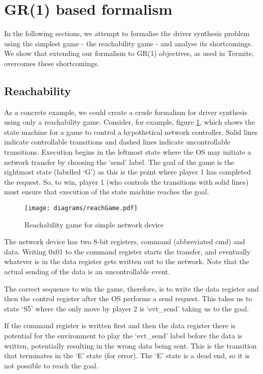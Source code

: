 \section{GR(1) based formalism}

In the following sections, we attempt to formalise the driver synthesis problem using the simplest game - the reachability game - and analyse its shortcomings. We show that extending our formalism to GR(1) objectives, as used in Termite, overcomes these shortcomings.

\subsection{Reachability}

As a concrete example, we could create a crude formalism for driver synthesis using only a reachability game. Consider, for example, figure \ref{fig:reach}, which shows the state machine for a game to control a hypothetical network controller. Solid lines indicate controllable transitions and dashed lines indicate uncontrollable transitions. Execution begins in the leftmost state where the OS may initiate a network transfer by choosing the `send' label. The goal of the game is the rightmost state (labelled `G') as this is the point where player 1 has completed the request. So, to win, player 1 (who controls the transitions with solid lines) must ensure that execution of the state machine reaches the goal. 

\begin{figure}[t]
\centering
\texttt{[image: diagrams/reachGame.pdf]}
\caption{Reachability game for simple network device}
\label{fig:reach}
\end{figure}

The network device has two 8-bit registers, command (abbreviated cmd) and data. Writing 0x01 to the command register starts the transfer, and eventually whatever is in the data register gets written out to the network. Note that the actual sending of the data is an uncontrollable event. 

The correct sequence to win the game, therefore, is to write the data register and then the control register after the OS performs a send request. This takes us to state `S5' where the only move by player 2 is `evt\_send' taking us to the goal. 

If the command register is written first and then the data register there is potential for the environment to play the `evt\_send' label before the data is written, potentially resulting in the wrong data being sent. This is the transition that terminates in the `E' state (for error). The `E' state is a dead end, so it is not possible to reach the goal. 


